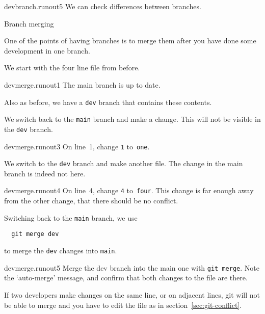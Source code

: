 \begin{gitstep}{devbranch.runout5}
  We can check differences between branches.
\end{gitstep}

\newpage
{} {Branch merging}
\label{sec:git-branch-merge}

One of the points of having branches is to merge
them after you have done some development in one branch.

We start with the four line file from before.

\begin{gitstep}{devmerge.runout1}
  The main branch is up to date.
\end{gitstep}

Also as before, we have a \lstinline{dev} branch that contains
these contents.


We switch back to the \lstinline{main} branch and make a change.
This will not be visible in the \lstinline{dev} branch.

\begin{gitstep}{devmerge.runout3}
  On line~1, change \lstinline{1} to~\lstinline{one}.
\end{gitstep}

We switch to the \lstinline{dev} branch and make another file.
The change in the main branch is indeed not here.

\begin{gitstep}{devmerge.runout4}
  On line~4, change \lstinline{4} to~\lstinline{four}.
  This change is far enough away from the other change,
  that there should be no conflict.
\end{gitstep}

Switching back to the \lstinline{main} branch, we use
\begin{lstlisting}
  git merge dev
\end{lstlisting}
to merge the \lstinline{dev} changes into \lstinline{main}.

\begin{gitstep}{devmerge.runout5}
  Merge the dev branch into the main one with \lstinline{git merge}.
  Note the `auto-merge' message,
  and confirm that both changes to the file are there.
\end{gitstep}

If two developers make changes on the same line, or on adjacent lines,
git will not be able to merge
and you have to edit the file as in section~\ref{sec:git-conflict}.

